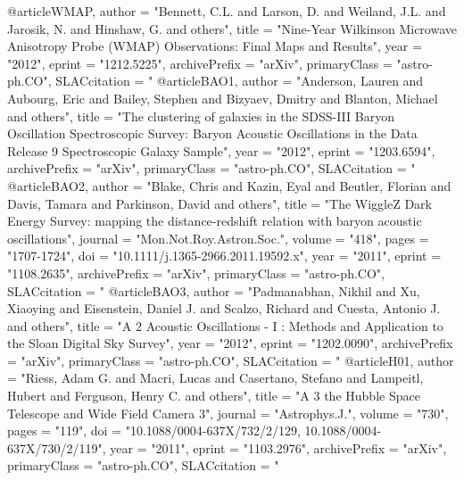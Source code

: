 @article{WMAP,
      author         = "Bennett, C.L. and Larson, D. and Weiland, J.L. and
                        Jarosik, N. and Hinshaw, G. and others",
      title          = "{Nine-Year Wilkinson Microwave Anisotropy Probe (WMAP)
                        Observations: Final Maps and Results}",
      year           = "2012",
      eprint         = "1212.5225",
      archivePrefix  = "arXiv",
      primaryClass   = "astro-ph.CO",
      SLACcitation   = "%
}
@article{BAO1,
      author         = "Anderson, Lauren and Aubourg, Eric and Bailey, Stephen
                        and Bizyaev, Dmitry and Blanton, Michael and others",
      title          = "{The clustering of galaxies in the SDSS-III Baryon
                        Oscillation Spectroscopic Survey: Baryon Acoustic
                        Oscillations in the Data Release 9 Spectroscopic Galaxy
                        Sample}",
      year           = "2012",
      eprint         = "1203.6594",
      archivePrefix  = "arXiv",
      primaryClass   = "astro-ph.CO",
      SLACcitation   = "%
}
@article{BAO2,
      author         = "Blake, Chris and Kazin, Eyal and Beutler, Florian and
                        Davis, Tamara and Parkinson, David and others",
      title          = "{The WiggleZ Dark Energy Survey: mapping the
                        distance-redshift relation with baryon acoustic
                        oscillations}",
      journal        = "Mon.Not.Roy.Astron.Soc.",
      volume         = "418",
      pages          = "1707-1724",
      doi            = "10.1111/j.1365-2966.2011.19592.x",
      year           = "2011",
      eprint         = "1108.2635",
      archivePrefix  = "arXiv",
      primaryClass   = "astro-ph.CO",
      SLACcitation   = "%
}
@article{BAO3,
      author         = "Padmanabhan, Nikhil and Xu, Xiaoying and Eisenstein,
                        Daniel J. and Scalzo, Richard and Cuesta, Antonio J. and
                        others",
      title          = "{A 2%
                        Acoustic Oscillations - I : Methods and Application to the
                        Sloan Digital Sky Survey}",
      year           = "2012",
      eprint         = "1202.0090",
      archivePrefix  = "arXiv",
      primaryClass   = "astro-ph.CO",
      SLACcitation   = "%
}
@article{H01,
      author         = "Riess, Adam G. and Macri, Lucas and Casertano, Stefano
                        and Lampeitl, Hubert and Ferguson, Henry C. and others",
      title          = "{A 3%
                        the Hubble Space Telescope and Wide Field Camera 3}",
      journal        = "Astrophys.J.",
      volume         = "730",
      pages          = "119",
      doi            = "10.1088/0004-637X/732/2/129, 10.1088/0004-637X/730/2/119",
      year           = "2011",
      eprint         = "1103.2976",
      archivePrefix  = "arXiv",
      primaryClass   = "astro-ph.CO",
      SLACcitation   = "%
}
